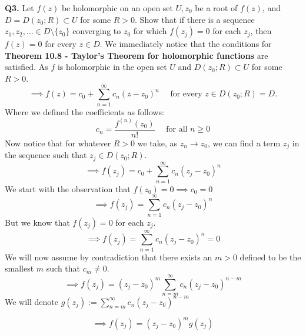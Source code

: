 \documentclass[12pt]{article}
\begin{document}
\noindent \textbf{Q3.} Let \( f(z) \) be holomorphic on an open set \( U, z_0 \) be a root of \( f(z) \), and \( D = D\left(z_0;R\right) \subset U \) for some \( R  > 0 \). Show that if there is a sequence \( z_1, z_2, \dots \in D \setminus \{z_0\} \) converging to \( z_0 \) for which \(f(z_j) = 0\) for each \(z_j\), then \( f(z) = 0 \) for every \(z \in D\). \newline
\linebreak
\noindent We immediately notice that the conditions for {\bfseries Theorem 10.8 - Taylor's Theorem for holomorphic functions  }are satisfied. As \(f\) is holomorphic in the open set \(U\) and \(D(z_0;R) \subset U\) for some \(R>0\).
\[
\implies f(z) = c_0 + \sum_{n=1}^{\infty}c_n \left(z-z_0\right)^n \quad \text{ for every } z\in D(z_0;R) = D.
\]
Where we defined the coefficients as follows:
\[
c_n = \frac{f^{(n)}\left(z_0\right)}{n!} \quad \text{ for all }n \geq 0
\]
Now notice that for whatever \(R>0\) we take, as \(z_n \to z_0\), we can find a term \(z_j\) in the sequence such that \(z_j \in D(z_0;R)\). 
\[
\implies f(z_j) = c_0 + \sum_{n=1}^{\infty}c_n \left(z_j-z_0\right)^n
\]
We start with the observation that \(f(z_0) = 0 \implies c_0 = 0\)
\[
\implies f(z_j) = \sum_{n=1}^{\infty}c_n \left(z_j-z_0\right)^n
\]
But we know that \(f(z_j) = 0 \) for each \(z_j\).
\[
\implies f(z_j) = \sum_{n=1}^{\infty}c_n \left(z_j-z_0\right)^n = 0
\]
We will now assume by contradiction that there exists an \(m > 0\) defined to be the smallest \(m\) such that \(c_m \neq 0\). 
\[
\implies f(z_j) = \left(z_j-z_0\right)^m\sum_{n=m}^{\infty}c_n\left(z_j-z_0\right)^{n-m}
\]
We will denote \(g(z_j) := \sum_{n=m}^{\infty}c_n\left(z_j-z_0\right)^{n-m}\)

\[
    \implies f(z_j) = \left(z_j-z_0\right)^m g(z_j)
\]
\end{document}
